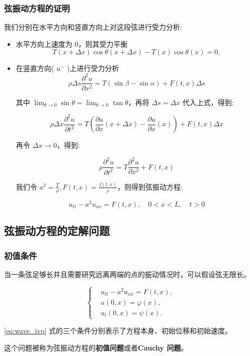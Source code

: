 \documentclass{beamer}
\begin{document}
\begin{frame}[allowframebreaks]
	\frametitle{弦振动方程的证明}
	我们分别在水平方向和竖直方向上对这段弦进行受力分析:

	\begin{itemize}
		\item 水平方向上速度为 $0$，则其受力平衡
		      $$
			      T(x+\Delta x)\cos\theta(x+\Delta x) - T(x)\cos\theta(x) = 0,
		      $$
		\item 在竖直方向( $u^-$ )上进行受力分析
		      $$
			      \rho\Delta s \frac{\partial^2u}{\partial x^2}=T(\sin\beta - \sin\alpha) + F(t,x)\Delta s
		      $$

		      其中 $\displaystyle\lim_{\theta\to 0}\sin\theta = \lim_{\theta\to 0}\tan\theta$，再将 $\Delta s = \Delta x$ 代入上式，得到:

		      $$
			      \rho\Delta x \frac{\partial^2u}{\partial t^2}=T(\frac{\partial u}{\partial x}(x+\Delta x) - \frac{\partial u}{\partial x}(x)) + F(t,x)\Delta x
		      $$

		      \newpage

		      再令 $\Delta x \to 0$，得到:

		      $$
			      \rho \frac{\partial^2u}{\partial t^2} = T\frac{\partial^2u}{\partial x^2} + F(t,x)
		      $$

		      我们令 $a^2 = \frac{T}{\rho},F(t,x)=\frac{f(t,x)}{\rho}$，则得到弦振动方程:

		      $$
			      u_{tt} -a^2u_{xx}=F(t,x), \quad 0 < x < L, \quad t > 0
		      $$
	\end{itemize}
\end{frame}


\subsection{弦振动方程的定解问题}

\begin{frame}[allowframebreaks]
	\frametitle{初值条件}
	当一条弦足够长并且需要研究远离两端的点的振动情况时，可以假设弦无限长。

	\begin{equation}
		\label{eq:wave_ivp}
		\left\{
		\begin{aligned}
			 & u_{tt}-a^2u_{xx}=F(t,x), \\
			 & u(0,x)=\varphi(x),       \\
			 & u_t(0,x)=\psi(x).
		\end{aligned}
		\right.
	\end{equation}

	\eqref{eq:wave_ivp} 式的三个条件分别表示了方程本身、初始位移和初始速度。\newline

	这个问题被称为弦振动方程的\textbf{初值问题}或者\textbf{Cauchy 问题}。
\end{frame}
\end{document}
